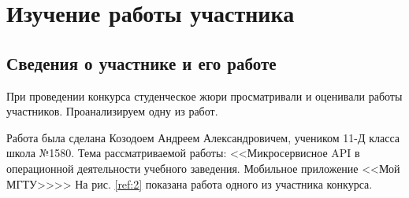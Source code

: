 \documentclass[12pt]{report}
\begin{document}
\chapter{Изучение работы участника}

\section{Сведения о участнике и его работе}

При проведении конкурса студенческое жюри просматривали и оценивали работы участников.
Проанализируем одну из работ.

Работа была сделана Козодоем Андреем Александровичем, учеником 11-Д класса школа №1580.
Тема рассматриваемой работы: <<Микросервисное API в операционной деятельности учебного заведения.
Мобильное приложение <<Мой МГТУ>>>> На рис. \ref{ref:2} показана работа одного из участника конкурса.

\begin{figure}[ht!]	
\end{figure}
\end{document}
